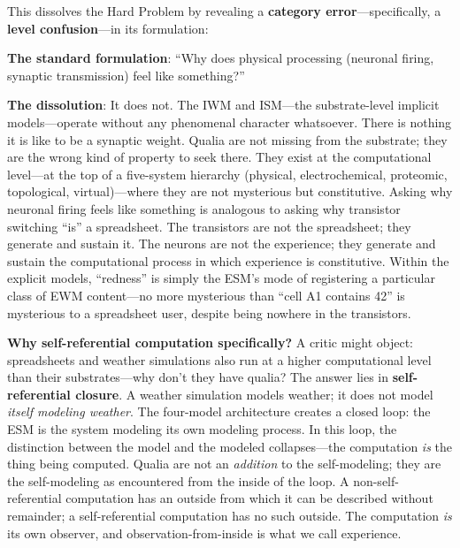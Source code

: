 \documentclass[12pt]{article}
\begin{document}
This dissolves the Hard Problem by revealing a \textbf{category error}---\hspace{0pt}specifically, a \textbf{level confusion}---\hspace{0pt}in its formulation:

\textbf{The standard formulation}: ``Why does physical processing (neuronal firing, synaptic transmission) feel like something?''

\textbf{The dissolution}: It does not. The IWM and ISM---\hspace{0pt}the substrate-level implicit models---\hspace{0pt}operate without any phenomenal character whatsoever. There is nothing it is like to be a synaptic weight. Qualia are not missing from the substrate; they are the wrong kind of property to seek there. They exist at the computational level---\hspace{0pt}at the top of a five-system hierarchy (physical, electrochemical, proteomic, topological, virtual)---\hspace{0pt}where they are not mysterious but constitutive. Asking why neuronal firing feels like something is analogous to asking why transistor switching ``is'' a spreadsheet. The transistors are not the spreadsheet; they generate and sustain it. The neurons are not the experience; they generate and sustain the computational process in which experience is constitutive. Within the explicit models, ``redness'' is simply the ESM's mode of registering a particular class of EWM content---\hspace{0pt}no more mysterious than ``cell A1 contains 42'' is mysterious to a spreadsheet user, despite being nowhere in the transistors.

\textbf{Why self-referential computation specifically?} A critic might object: spreadsheets and weather simulations also run at a higher computational level than their substrates---\hspace{0pt}why don't they have qualia? The answer lies in \textbf{self-referential closure}. A weather simulation models weather; it does not model \emph{itself modeling weather}. The four-model architecture creates a closed loop: the ESM is the system modeling its own modeling process. In this loop, the distinction between the model and the modeled collapses---\hspace{0pt}the computation \emph{is} the thing being computed. Qualia are not an \emph{addition} to the self-modeling; they are the self-modeling as encountered from the inside of the loop. A non-self-referential computation has an outside from which it can be described without remainder; a self-referential computation has no such outside. The computation \emph{is} its own observer, and observation-from-inside is what we call experience.
\end{document}
